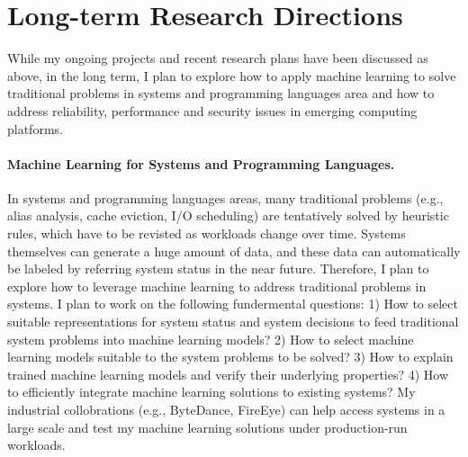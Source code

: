 \documentclass[10pt]{article}
\begin{document}
\section{Long-term Research Directions}

While my ongoing projects and recent research plans have been discussed as above,
in the long term, I plan to explore how to apply machine learning to solve
traditional problems in systems and programming languages area and 
how to address reliability, performance and security issues 
in emerging computing platforms. 


\vspace{-.1in}
\paragraph{Machine Learning for Systems and Programming Languages.} 
In systems and programming languages areas, 
many traditional problems (e.g., alias analysis, cache eviction, I/O scheduling) 
are tentatively solved by heuristic rules, which have to be revisted as 
workloads change over time. 
Systems themselves can generate a huge amount of data, 
and these data can automatically be labeled by 
referring system status in the near future. 
Therefore, I plan to explore how to leverage machine learning
to address traditional problems in systems.
I plan to work on the following fundermental questions:
1) How to select suitable representations for system status 
and system decisions to feed traditional system problems 
into machine learning models?
2) How to select machine learning models suitable 
to the system problems to be solved?
3) How to explain trained machine learning models 
and verify their underlying properties?
4) How to efficiently integrate machine 
learning solutions to existing systems?
My industrial collobrations (e.g., ByteDance, FireEye) 
can help access systems in a large scale and test my machine learning 
solutions under production-run workloads. 


\vspace{-.1in}
\end{document}
